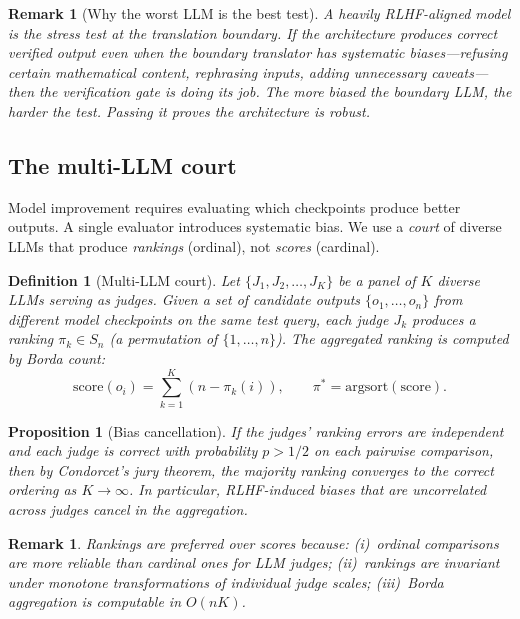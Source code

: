 \documentclass[11pt,a4paper]{article}
\newtheorem{proposition}[theorem]{Proposition}
\newtheorem{definition}[theorem]{Definition}
\newtheorem{remark}[theorem]{Remark}
\begin{document}
\begin{remark}[Why the worst LLM is the best test]
A heavily RLHF-aligned model is the \emph{stress test}
at the translation boundary.
If the architecture produces correct verified output even
when the boundary translator has systematic biases---refusing
certain mathematical content, rephrasing inputs, adding
unnecessary caveats---then the verification gate is doing its job.
The more biased the boundary LLM, the harder the test.
Passing it proves the architecture is robust.
\end{remark}

\subsection{The multi-LLM court}

Model improvement requires evaluating which checkpoints
produce better outputs.
A single evaluator introduces systematic bias.
We use a \emph{court} of diverse LLMs that produce
\emph{rankings} (ordinal), not \emph{scores} (cardinal).

\begin{definition}[Multi-LLM court]\label{def:court}
Let $\{J_1, J_2, \ldots, J_K\}$ be a panel of $K$ diverse
LLMs serving as judges.
Given a set of candidate outputs
$\{o_1, \ldots, o_n\}$ from different model checkpoints
on the same test query, each judge $J_k$ produces
a ranking $\pi_k \in S_n$ (a permutation of $\{1, \ldots, n\}$).
The aggregated ranking is computed by Borda count:
\begin{equation}\label{eq:borda}
\mathrm{score}(o_i) = \sum_{k=1}^{K} (n - \pi_k(i)),
\qquad
\pi^* = \mathrm{argsort}(\mathrm{score}).
\end{equation}
\end{definition}

\begin{proposition}[Bias cancellation]\label{prop:condorcet}
If the judges' ranking errors are independent and each
judge is correct with probability $p > 1/2$ on each
pairwise comparison, then by Condorcet's jury theorem,
the majority ranking converges to the correct ordering
as $K \to \infty$.
In particular, RLHF-induced biases that are uncorrelated
across judges cancel in the aggregation.
\end{proposition}

\begin{remark}
Rankings are preferred over scores because:
(i)~ordinal comparisons are more reliable than cardinal
ones for LLM judges;
(ii)~rankings are invariant under monotone transformations
of individual judge scales;
(iii)~Borda aggregation is computable in $O(nK)$.
\end{remark}
\end{document}
